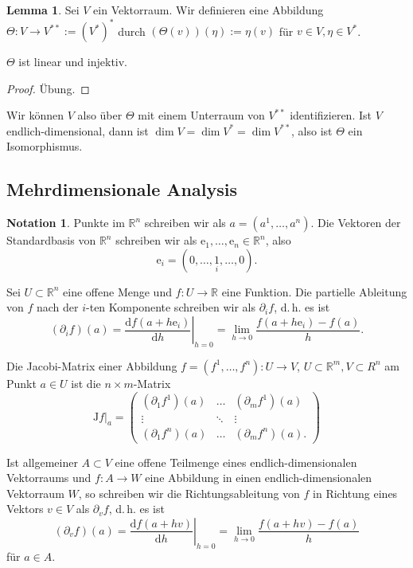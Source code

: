 \documentclass[a4paper]{scrbook}
\numberwithin{equation}{chapter}
\newcommand{\D}{\mathrm{d}}
\newcommand{\e}{\mathrm{e}}
\newcommand{\R}{\mathbb{R}}
\theoremstyle{definition}
\newtheorem{lemma}[defn]{Lemma}
\newtheorem{nota}[defn]{Notation}
\newcommand{\bewUeb}{\begin{proof}Übung.\end{proof}}
\begin{document}
\begin{lemma}\label{lemma:Bidualraum}
	Sei $V$ ein Vektorraum. Wir definieren eine Abbildung $\Theta\colon V \to V^{**} := (V^*)^*$ durch $(\Theta(v))(\eta) := \eta(v)$ für $v \in V, \eta \in V^*$.

	$\Theta$ ist linear und injektiv.

	\bewUeb
\end{lemma}
Wir können $V$ also über $\Theta$ mit einem Unterraum von $V^{**}$ identifizieren. Ist $V$ endlich-dimensional, dann ist $\dim V = \dim V^* = \dim V^{**}$, also ist $\Theta$ ein Isomorphismus.

\subsection{Mehrdimensionale Analysis}
\begin{nota}
	Punkte im $\mathbb R^n$ schreiben wir als $a = (a^1, \dots, a^n)$. Die Vektoren der Standardbasis von $\mathbb R^n$ schreiben wir als $\e_1, \dots, \e_n \in \mathbb R^n$, also \[\e_i = (0,\dots,\underset{i}{1},\dots,0).\]

	Sei $U \subset \mathbb R^n$ eine offene Menge und $f\colon U \to \mathbb R$ eine Funktion. Die partielle Ableitung von $f$ nach der $i$-ten Komponente schreiben wir als $\partial_i f$, d.\,h. es ist
	\[(\partial_i f)(a) = \left.\frac{\D f(a + h \e_i)}{\D h}\right|_{h=0} = \lim_{h\to 0} \frac{f(a + h \e_i) - f(a)}{h}.\]

	Die Jacobi-Matrix einer Abbildung $f = (f^1, \dots, f^n) \colon U \to V$, $U \subset \R^m, V \subset R^n$ am Punkt $a \in U$ ist die $n\times m$-Matrix
	\[\left.\mathrm{J}f\right|_a = \begin{pmatrix}
		(\partial_1 f^1)(a) & \dots & (\partial_m f^1)(a) \\
		\vdots & \ddots & \vdots \\
		(\partial_1 f^n)(a) & \dots & (\partial_m f^n)(a).
	\end{pmatrix}\]

	Ist allgemeiner $A \subset V$ eine offene Teilmenge eines endlich-dimensionalen Vektorraums und $f\colon A \to W$ eine Abbildung in einen endlich-dimensionalen Vektorraum $W$, so schreiben wir die Richtungsableitung von $f$ in Richtung eines Vektors $v\in V$ als $\partial_v f$, d.\,h. es ist
	\[(\partial_v f)(a) = \left.\frac{\D f(a + h v)}{\D h}\right|_{h=0} = \lim_{h\to 0} \frac{f(a + h v) - f(a)}{h}\]
	für $a \in A$.
\end{nota}
\end{document}
